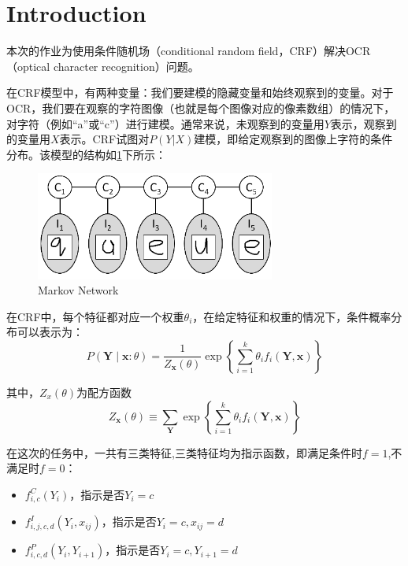 \documentclass[a4paper,UTF8]{article}
\numberwithin{equation}{section}
\begin{document}
\newpage
\section{Introduction}
本次的作业为使用条件随机场（conditional random field，CRF）解决OCR（optical character recognition）问题。

在CRF模型中，有两种变量：我们要建模的隐藏变量和始终观察到的变量。对于OCR，我们要在观察的字符图像（也就是每个图像对应的像素数组）的情况下，对字符（例如“a”或“c”）进行建模。通常来说，未观察到的变量用$Y$表示，观察到的变量用$X$表示。CRF试图对$P(Y|X)$建模，即给定观察到的图像上字符的条件分布。该模型的结构如\ref{Fig.main1}下所示：
\begin{figure}[h] 
\centering
\includegraphics[width=0.7\textwidth]{figs/fig1.png} 
\caption{Markov Network} 
\label{Fig.main1}
\end{figure}

在CRF中，每个特征都对应一个权重$\theta_i$，在给定特征和权重的情况下，条件概率分布可以表示为：
\begin{equation}
P(\mathbf{Y} \mid \mathbf{x}: \theta)=\frac{1}{Z_{\mathbf{x}}(\theta)} \exp \left\{\sum_{i=1}^{k} \theta_{i} f_{i}\left(\mathbf{Y}, \mathbf{x}\right)\right\}\label{eq1}
\end{equation}

其中，$Z_x(\theta)$为配方函数
\begin{equation}
Z_{\mathbf{x}}(\theta) \equiv \sum_{\mathbf{Y}} \exp \left\{\sum_{i=1}^{k} \theta_{i} f_{i}\left(\mathbf{Y}, \mathbf{x}\right)\right\}
\end{equation}

在这次的任务中，一共有三类特征,三类特征均为指示函数，即满足条件时$f=1$,不满足时$f=0$：
\begin{itemize}
    \item $f_{i, c}^{C}\left(Y_{i}\right)$，指示是否$Y_i = c$
    \item $f_{i, j, c, d}^{I}\left(Y_{i}, x_{i j}\right)$，指示是否$Y_i=c,x_{ij}=d$
    \item $f_{i, c, d}^{P}\left(Y_{i}, Y_{i+1}\right)$，指示是否$Y_i=c,Y_{i+1}=d$
\end{itemize}
\end{document}
